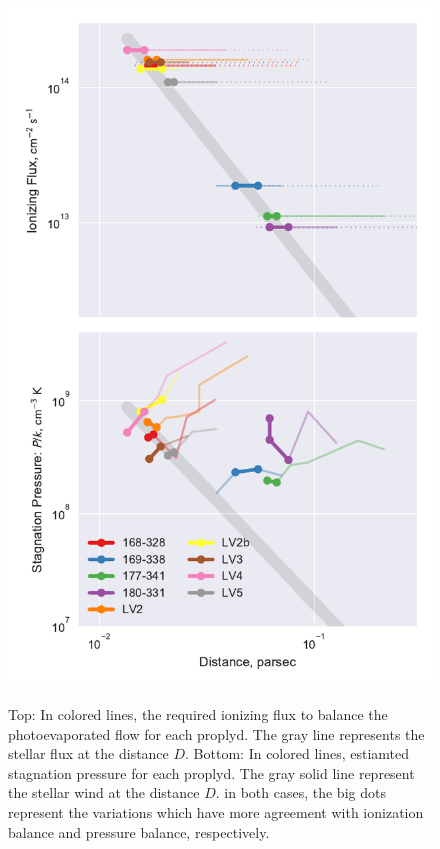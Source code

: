 \begin{figure}
\includegraphics[width=\linewidth]{../../proplyd-wind-figs/plot-wind-fits}
\label{fig:pressure}
\caption{Top: In colored lines,  the required ionizing flux to balance the photoevaporated flow for each proplyd. The gray line represents the stellar flux at the distance $D$. 
Bottom: In colored lines, estiamted stagnation pressure for each proplyd. 
The gray solid line represent the stellar wind at the distance $D$. in both cases, the big dots represent the variations which have more agreement with ionization balance and pressure balance, respectively.}
\end{figure}

